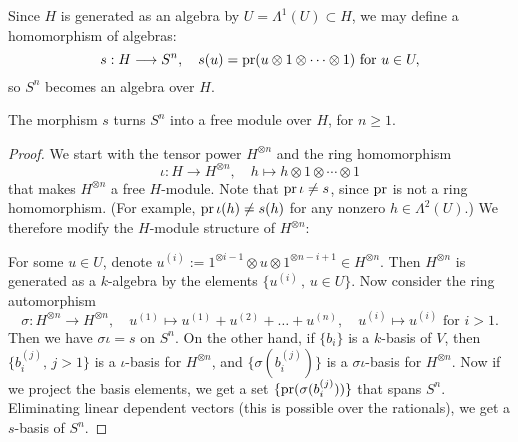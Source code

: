 Since $H$ is generated as an algebra by $U=\Lambda^1(U)\subset H$, we may define a homomorphism of algebras:
$$ s : H \longrightarrow S^n, \quad s(u) = \operatorname{pr}( u \otimes 1\otimes\cdots\otimes 1)\text{ for }u\in U, $$
so $S^n$ becomes an algebra over $H$.
\begin{lemma}
\label{SuperFree}
The morphism $s$ turns $S^n$ into a free module over $H$, for $n\geq 1$.
\end{lemma}
\begin{proof}
We start with the tensor power $H^{\otimes n}$ and the ring homomorphism 
$$
\iota : H \longrightarrow H^{\otimes n},\quad h\longmapsto h\otimes 1\otimes\cdots\otimes 1
$$
that makes $H^{\otimes n}$ a free $H$-module. Note that $\operatorname{pr} \iota \neq s$, since $\operatorname{pr}$ is not a ring homomorphism.
(For example, $\operatorname{pr}\iota(h)\neq s(h)$ for any nonzero $h\in\Lambda^2(U)$.)
We therefore modify the $H$-module structure of $H^{\otimes n}$:

For some $u\in U$, denote $u^{(i)} := 1^{\otimes i-1}\otimes u\otimes 1^{\otimes n-i+1} \in H^{\otimes n}$. Then $H^{\otimes n}$ is generated as a $k$-algebra by the elements $\{u^{(i)}\,,\,u\in U\}$. Now consider the ring automorphism
$$
\sigma : H^{\otimes n} \longrightarrow H^{\otimes n}, \quad u^{(1)} \longmapsto u^{(1)} +u^{(2)} + \ldots + u^{(n)}, \quad
u^{(i)} \longmapsto u^{(i)} \text{ for } i>1.
$$
Then we have $\sigma\iota = s$ on $S^n$. On the other hand, if $\{b_i\}$ is a $k$-basis of $V$, then $\{b_i^{(j)},\,j>1\} $ is a $\iota$-basis for $H^{\otimes n}$, and $\{\sigma(b_i^{(j)})\}$ is a $\sigma\iota$-basis for $H^{\otimes n}$.
Now if we project the basis elements, we get a set $\{\operatorname{pr}(\sigma(b_i^{(j)}))\}$ that spans $S^n$. Eliminating linear dependent vectors (this is possible over the rationals), we get a $s$-basis of $S^n$.
\end{proof}

